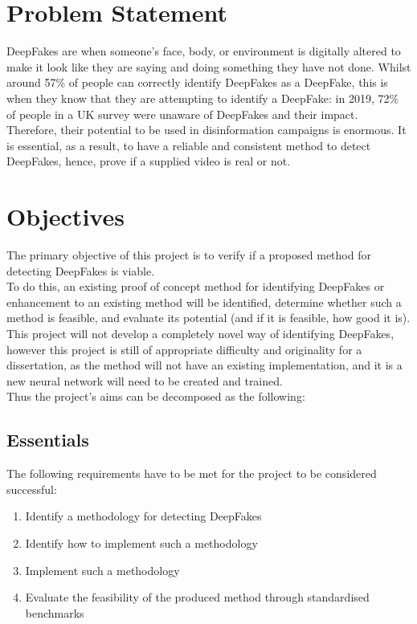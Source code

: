 \section{Problem Statement}
DeepFakes are when someone's face, body, or environment is digitally altered to make it look like they are saying and doing something they have not done. Whilst around 57\% of people can correctly identify DeepFakes as a DeepFake\cite{human-detection}, this is when they know that they are attempting to identify a DeepFake: in 2019, 72\% of people in a UK survey were unaware of DeepFakes and their impact\cite{human-aware}. Therefore, their potential to be used in disinformation campaigns is enormous. It is essential, as a result, to have a reliable and consistent method to detect DeepFakes, hence, prove if a supplied video is real or not.


\section{Objectives}
The primary objective of this project is to verify if a proposed method for detecting DeepFakes is viable.\\

To do this, an existing proof of concept method for identifying DeepFakes or enhancement to an existing method will be identified, determine whether such a method is feasible, and evaluate its potential (and if it is feasible, how good it is). This project will not develop a completely novel way of identifying DeepFakes, however this project is still of appropriate difficulty and originality for a dissertation, as the method will not have an existing implementation, and it is a new neural network will need to be created and trained. \\

\noindent
Thus the project's aims can be decomposed as the following:

\subsection{Essentials}
The following requirements have to be met for the project to be considered successful:
\begin{enumerate}
    \item Identify a methodology for detecting DeepFakes
    \item Identify how to implement such a methodology
    \item Implement such a methodology
    \item Evaluate the feasibility of the produced method through standardised benchmarks
\end{enumerate}
